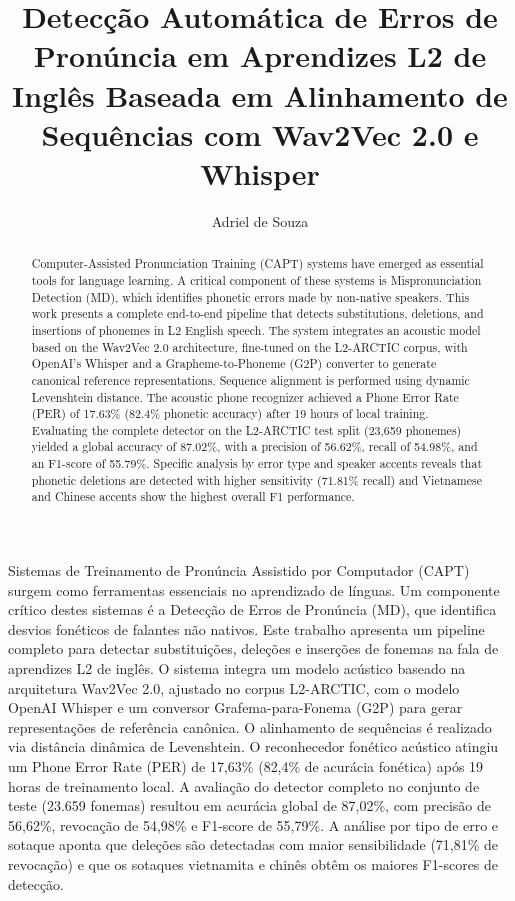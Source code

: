 \documentclass[12pt]{article}
\title{Detecção Automática de Erros de Pronúncia em Aprendizes L2 de Inglês Baseada em Alinhamento de Sequências com Wav2Vec 2.0 e Whisper}
\author{Adriel de Souza\inst{1}}
\begin{document}
\maketitle

\begin{abstract}
Computer-Assisted Pronunciation Training (CAPT) systems have emerged as essential tools for language learning. A critical component of these systems is Mispronunciation Detection (MD), which identifies phonetic errors made by non-native speakers. This work presents a complete end-to-end pipeline that detects substitutions, deletions, and insertions of phonemes in L2 English speech. The system integrates an acoustic model based on the Wav2Vec 2.0 architecture, fine-tuned on the L2-ARCTIC corpus, with OpenAI's Whisper and a Grapheme-to-Phoneme (G2P) converter to generate canonical reference representations. Sequence alignment is performed using dynamic Levenshtein distance. The acoustic phone recognizer achieved a Phone Error Rate (PER) of 17.63\% (82.4\% phonetic accuracy) after 19 hours of local training. Evaluating the complete detector on the L2-ARCTIC test split (23,659 phonemes) yielded a global accuracy of 87.02\%, with a precision of 56.62\%, recall of 54.98\%, and an F1-score of 55.79\%. Specific analysis by error type and speaker accents reveals that phonetic deletions are detected with higher sensitivity (71.81\% recall) and Vietnamese and Chinese accents show the highest overall F1 performance.
\end{abstract}

\begin{resumo}
Sistemas de Treinamento de Pronúncia Assistido por Computador (CAPT) surgem como ferramentas essenciais no aprendizado de línguas. Um componente crítico destes sistemas é a Detecção de Erros de Pronúncia (MD), que identifica desvios fonéticos de falantes não nativos. Este trabalho apresenta um pipeline completo para detectar substituições, deleções e inserções de fonemas na fala de aprendizes L2 de inglês. O sistema integra um modelo acústico baseado na arquitetura Wav2Vec 2.0, ajustado no corpus L2-ARCTIC, com o modelo OpenAI Whisper e um conversor Grafema-para-Fonema (G2P) para gerar representações de referência canônica. O alinhamento de sequências é realizado via distância dinâmica de Levenshtein. O reconhecedor fonético acústico atingiu um Phone Error Rate (PER) de 17,63\% (82,4\% de acurácia fonética) após 19 horas de treinamento local. A avaliação do detector completo no conjunto de teste (23.659 fonemas) resultou em acurácia global de 87,02\%, com precisão de 56,62\%, revocação de 54,98\% e F1-score de 55,79\%. A análise por tipo de erro e sotaque aponta que deleções são detectadas com maior sensibilidade (71,81\% de revocação) e que os sotaques vietnamita e chinês obtêm os maiores F1-scores de detecção.
\end{resumo}
\end{document}
